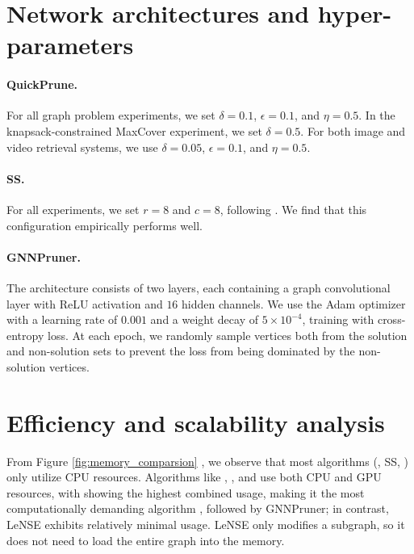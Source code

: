 \section{Network architectures and hyper-parameters}



\paragraph{QuickPrune.} For all graph problem experiments, we set $\delta = 0.1$, $\epsilon = 0.1$, and $\eta = 0.5$. In the knapsack-constrained MaxCover experiment, we set $\delta = 0.5$. For both image and video retrieval systems, we use $\delta = 0.05$, $\epsilon = 0.1$, and $\eta = 0.5$.


\paragraph{SS.} For all experiments, we set $r=8$ and $c=8$, following \citet{zhou2017scaling}. We find that this configuration empirically performs well.


\paragraph{GNNPruner.} The architecture consists of two layers, each containing a graph convolutional layer with ReLU activation and $16 $ hidden channels. We use the Adam optimizer with a learning rate of $0.001$ and a weight decay of $5 \times 10^{-4}$, training with cross-entropy loss. At each epoch, we randomly sample vertices both from the solution and non-solution sets to prevent the loss from being dominated by the non-solution vertices. 





\section{Efficiency and scalability analysis} \label{appendix:scalability}

From Figure \ref{fig:memory_comparsion} , we observe that most algorithms (\qs, SS, \gcomb) only utilize CPU resources. Algorithms like \lense, \comb, and \gnn use both CPU and GPU resources, with \comb showing the highest combined usage, making it the most computationally demanding algorithm , followed by GNNPruner; in contrast, LeNSE exhibits relatively minimal usage. LeNSE only modifies a subgraph, so it does not need to load the entire graph into the memory.


